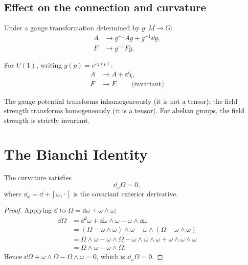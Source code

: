 \subsection{Effect on the connection and curvature}

Under a gauge transformation determined by $g: M \to G$:
\begin{align}
A &\to g^{-1}Ag + g^{-1}\dd g, \label{eq:gauge_A} \\
F &\to g^{-1}Fg. \label{eq:gauge_F}
\end{align}

For $U(1)$, writing $g(p) = e^{i\chi(p)}$:
\begin{align}
A &\to A + \dd\chi, \\
F &\to F. \qquad \text{(invariant)}
\end{align}

The gauge potential transforms inhomogeneously (it is not a tensor); the field strength transforms homogeneously (it is a tensor). For abelian groups, the field strength is strictly invariant.

\section{The Bianchi Identity}

\begin{theorem}
The curvature satisfies
\begin{equation}
\boxed{\dd_\omega \Omega = 0,}
\end{equation}
where $\dd_\omega = \dd + [\omega, \cdot\,]$ is the covariant exterior derivative.
\end{theorem}

\begin{proof}
Applying $\dd$ to $\Omega = \dd\omega + \omega\wedge\omega$:
\begin{align}
\dd\Omega &= \dd^2\omega + \dd\omega\wedge\omega - \omega\wedge\dd\omega \\
&= (\Omega - \omega\wedge\omega)\wedge\omega - \omega\wedge(\Omega - \omega\wedge\omega) \\
&= \Omega\wedge\omega - \omega\wedge\Omega - \omega\wedge\omega\wedge\omega + \omega\wedge\omega\wedge\omega \\
&= \Omega\wedge\omega - \omega\wedge\Omega.
\end{align}
Hence $\dd\Omega + \omega\wedge\Omega - \Omega\wedge\omega = 0$, which is $\dd_\omega\Omega = 0$.
\end{proof}

